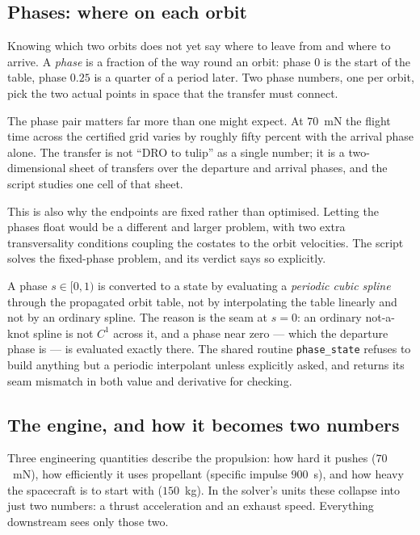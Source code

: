 \documentclass[11pt]{article}
\newcommand{\file}[1]{\texttt{#1}}
\begin{document}
\subsection{Phases: where on each orbit}

\begin{eli}
Knowing which two orbits does not yet say where to leave from and where to
arrive. A \emph{phase} is a fraction of the way round an orbit: phase $0$ is
the start of the table, phase $0.25$ is a quarter of a period later. Two phase
numbers, one per orbit, pick the two actual points in space that the transfer
must connect.
\end{eli}

\begin{intu}
The phase pair matters far more than one might expect. At $70$~mN the flight
time across the certified grid varies by roughly fifty percent with the arrival
phase alone. The transfer is not ``DRO to tulip'' as a single number; it is a
two-dimensional sheet of transfers over the departure and arrival phases, and
the script studies one cell of that sheet.

This is also why the endpoints are fixed rather than optimised. Letting the
phases float would be a different and larger problem, with two extra
transversality conditions coupling the costates to the orbit velocities. The
script solves the fixed-phase problem, and its verdict says so explicitly.
\end{intu}

\begin{rig}
A phase $s \in [0,1)$ is converted to a state by evaluating a \emph{periodic
cubic spline} through the propagated orbit table, not by interpolating the
table linearly and not by an ordinary spline. The reason is the seam at
$s = 0$: an ordinary not-a-knot spline is not $C^1$ across it, and a phase near
zero --- which the departure phase is --- is evaluated exactly there. The
shared routine \file{phase\_state} refuses to build anything but a periodic
interpolant unless explicitly asked, and returns its seam mismatch in both
value and derivative for checking.
\end{rig}

\subsection{The engine, and how it becomes two numbers}

\begin{eli}
Three engineering quantities describe the propulsion: how hard it pushes
($70$~mN), how efficiently it uses propellant (specific impulse $900$~s), and
how heavy the spacecraft is to start with ($150$~kg). In the solver's units
these collapse into just two numbers: a thrust acceleration and an exhaust
speed. Everything downstream sees only those two.
\end{eli}
\end{document}
